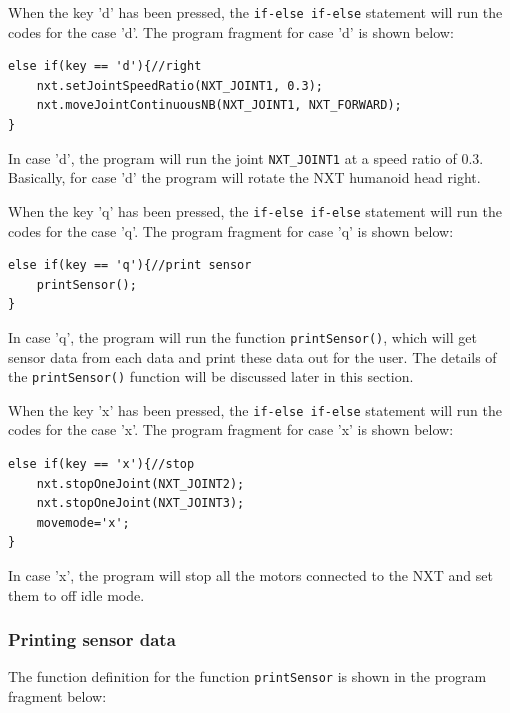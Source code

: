 \documentclass[11pt]{article}
\begin{document}
When the key 'd' has been pressed, the \verb+if-else if-else+ statement will run the codes for the case 'd'.
The program fragment for case 'd' is shown below:
\begin{verbatim} 
else if(key == 'd'){//right
    nxt.setJointSpeedRatio(NXT_JOINT1, 0.3);
    nxt.moveJointContinuousNB(NXT_JOINT1, NXT_FORWARD);
}
\end{verbatim}

In case 'd', the program will run the joint \verb+NXT_JOINT1+ at a speed ratio of 0.3.
Basically, for case 'd' the program will rotate the NXT humanoid head right.\\
\newline

When the key 'q' has been pressed, the \verb+if-else if-else+ statement will run the codes for the case 'q'.
The program fragment for case 'q' is shown below:
\begin{verbatim} 
else if(key == 'q'){//print sensor
    printSensor();
}
\end{verbatim}
In case 'q', the program will run the function \verb+printSensor()+, which will get sensor data from each data and
print these data out for the user. The details of the \verb+printSensor()+ function will be discussed later in this 
section.\\
\newline

When the key 'x' has been pressed, the \verb+if-else if-else+ statement will run the codes for the case 'x'.
The program fragment for case 'x' is shown below:
\begin{verbatim} 
else if(key == 'x'){//stop
    nxt.stopOneJoint(NXT_JOINT2);
    nxt.stopOneJoint(NXT_JOINT3);
    movemode='x';
}
\end{verbatim}
In case 'x', the program will stop all the motors connected to the NXT and set them to off idle mode.

\subsubsection*{Printing sensor data}
The function definition for the function \verb+printSensor+ is shown in the program fragment below:
\end{document}
